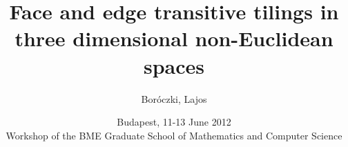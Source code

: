 \usepackage[english]{babel}
\usepackage[T1]{fontenc}
\usepackage[utf8]{inputenc}
\usepackage{graphicx}
\usepackage{listings}
\usepackage{amsmath}
\usepackage{amssymb}
\usepackage{ae,aecompl}
\usepackage{fix-cm}


\beamertemplatenavigationsymbolsempty
\beamertemplatetextbibitems

\newcommand{\leftexp}[2]{{\vphantom{#2}}^{#1}{#2}}


\title{Face and edge transitive tilings in three dimensional non-Euclidean
spaces}
\author{Boróczki, Lajos}
\date{Budapest, 11-13 June 2012 \\{\tiny Workshop of the BME Graduate School of
Mathematics and Computer Science}}



\begin{frame}
  \maketitle
\end{frame}

\begin{frame}
  \tableofcontents
\end{frame}
\newpage

